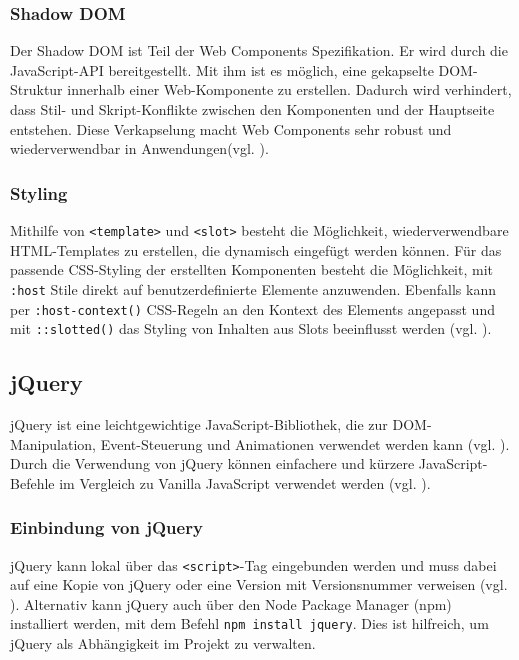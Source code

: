 \documentclass[oneside]{ausarbeitung}
\begin{document}
\subsubsection{Shadow DOM}
Der Shadow DOM ist Teil der Web Components Spezifikation. Er wird durch die JavaScript-API bereitgestellt. Mit ihm ist es möglich, eine gekapselte DOM-Struktur innerhalb einer Web-Komponente zu erstellen. Dadurch wird verhindert, dass Stil- und Skript-Konflikte zwischen den Komponenten und der Hauptseite entstehen. Diese Verkapselung macht Web Components sehr robust und wiederverwendbar in Anwendungen(vgl. \parencite{webcomponents}).

\subsubsection{Styling}
Mithilfe von \texttt{<template>} und \texttt{<slot>} besteht die Möglichkeit, wiederverwendbare HTML-Templates zu erstellen, die dynamisch eingefügt werden können. Für das passende CSS-Styling der erstellten Komponenten besteht die Möglichkeit, mit \texttt{:host} Stile direkt auf benutzerdefinierte Elemente anzuwenden. Ebenfalls kann per \texttt{:host-context()} CSS-Regeln an den Kontext des Elements angepasst und mit \texttt{::slotted()} das Styling von Inhalten aus Slots beeinflusst werden (vgl. \parencite{webcomponents}).


\subsection{jQuery}
jQuery ist eine leichtgewichtige JavaScript-Bibliothek, die zur DOM-Manipulation, Event-Steuerung und Animationen verwendet werden kann (vgl. \parencite{jquery_api}).  
Durch die Verwendung von jQuery können einfachere und kürzere JavaScript-Befehle im Vergleich zu Vanilla JavaScript verwendet werden (vgl. \parencite{jquery_api}).  

\subsubsection{Einbindung von jQuery}

jQuery kann lokal über das \texttt{\textless script\textgreater}-Tag eingebunden werden und muss dabei auf eine Kopie von jQuery oder eine Version mit Versionsnummer verweisen (vgl. \parencite{jquery_api}).  
Alternativ kann jQuery auch über den Node Package Manager (npm) installiert werden, mit dem Befehl \texttt{npm install jquery}. Dies ist hilfreich, um jQuery als Abhängigkeit im Projekt zu verwalten. 
\end{document}
